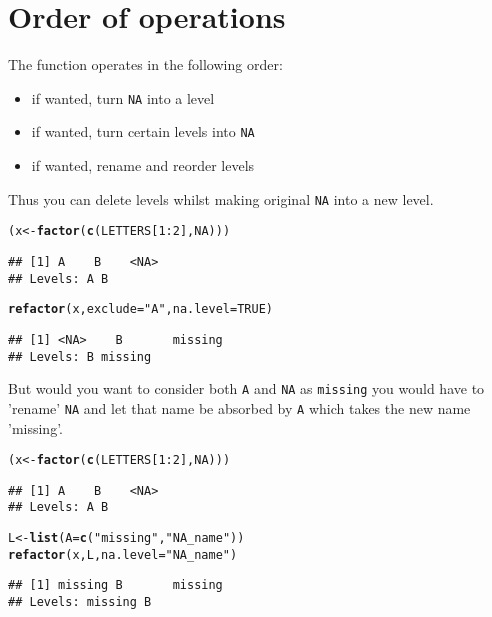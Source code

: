 \documentclass{article}\usepackage[]{graphicx}\usepackage[]{color}
\makeatletter
\newcommand{\hlnum}[1]{\textcolor[rgb]{0.686,0.059,0.569}{#1}}%
\newcommand{\hlstr}[1]{\textcolor[rgb]{0.192,0.494,0.8}{#1}}%
\newcommand{\hlopt}[1]{\textcolor[rgb]{0,0,0}{#1}}%
\newcommand{\hlstd}[1]{\textcolor[rgb]{0.345,0.345,0.345}{#1}}%
\newcommand{\hlkwb}[1]{\textcolor[rgb]{0.69,0.353,0.396}{#1}}%
\newcommand{\hlkwc}[1]{\textcolor[rgb]{0.333,0.667,0.333}{#1}}%
\newcommand{\hlkwd}[1]{\textcolor[rgb]{0.737,0.353,0.396}{\textbf{#1}}}%
\newenvironment{kframe}{%
 \def\at@end@of@kframe{}%
 \ifinner\ifhmode%
  \def\at@end@of@kframe{\end{minipage}}%
  \begin{minipage}{\columnwidth}%
 \fi\fi%
 \def\FrameCommand##1{\hskip\@totalleftmargin \hskip-\fboxsep
 \colorbox{shadecolor}{##1}\hskip-\fboxsep
     \hskip-\linewidth \hskip-\@totalleftmargin \hskip\columnwidth}%
 \MakeFramed {\advance\hsize-\width
   \@totalleftmargin\z@ \linewidth\hsize
   \@setminipage}}%
 {\par\unskip\endMakeFramed%
 \at@end@of@kframe}
\newenvironment{knitrout}{}{} %
\newcommand{\code}{\texttt}
\makeatother
\begin{document}
\section{Order of operations}
The function operates in the following order:
\begin{itemize}
\item if wanted, turn \code{NA} into a level
\item if wanted, turn certain levels into \code{NA}
\item if wanted, rename and reorder levels
\end{itemize}
Thus you can delete levels whilst making original \code{NA} into a new level.
\begin{knitrout}
\color{fgcolor}\begin{kframe}
\begin{alltt}
\hlstd{(x} \hlkwb{<-} \hlkwd{factor}\hlstd{(}\hlkwd{c}\hlstd{(LETTERS[}\hlnum{1}\hlopt{:}\hlnum{2}\hlstd{],}\hlnum{NA}\hlstd{)))}
\end{alltt}
\begin{verbatim}
## [1] A    B    <NA>
## Levels: A B
\end{verbatim}
\begin{alltt}
\hlkwd{refactor}\hlstd{(x,} \hlkwc{exclude}\hlstd{=}\hlstr{"A"}\hlstd{,} \hlkwc{na.level}\hlstd{=}\hlnum{TRUE}\hlstd{)}
\end{alltt}
\begin{verbatim}
## [1] <NA>    B       missing
## Levels: B missing
\end{verbatim}
\end{kframe}
\end{knitrout}
But would you want to consider both \code{A} and \code{NA} as \code{missing} you would have to 'rename' \code{NA} and let that name be absorbed by \code{A} which takes the new name 'missing'.
\begin{knitrout}
\color{fgcolor}\begin{kframe}
\begin{alltt}
\hlstd{(x} \hlkwb{<-} \hlkwd{factor}\hlstd{(}\hlkwd{c}\hlstd{(LETTERS[}\hlnum{1}\hlopt{:}\hlnum{2}\hlstd{],}\hlnum{NA}\hlstd{)))}
\end{alltt}
\begin{verbatim}
## [1] A    B    <NA>
## Levels: A B
\end{verbatim}
\begin{alltt}
\hlstd{L} \hlkwb{<-} \hlkwd{list}\hlstd{(}\hlkwc{A}\hlstd{=}\hlkwd{c}\hlstd{(}\hlstr{"missing"}\hlstd{,} \hlstr{"NA_name"}\hlstd{))}
\hlkwd{refactor}\hlstd{(x, L,} \hlkwc{na.level}\hlstd{=}\hlstr{"NA_name"}\hlstd{)}
\end{alltt}
\begin{verbatim}
## [1] missing B       missing
## Levels: missing B
\end{verbatim}
\end{kframe}
\end{knitrout}
\end{document}
